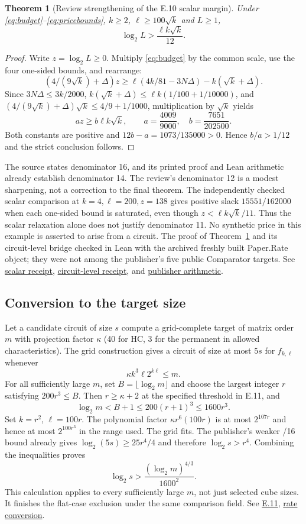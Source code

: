 \documentclass[11pt,letterpaper]{article}
\newtheorem{theorem}{Theorem}[section]
\theoremstyle{definition}\newtheorem{definition}[theorem]{Definition}\newtheorem{example}[theorem]{Example}
\theoremstyle{remark}\newtheorem{remark}[theorem]{Remark}
\newcommand{\pub}[3]{\href{https://github.com/anthropics/formal-math/blob/11b6c7e3c927df2658f513b6b68ea7f8929c62c5/vp-vnp/#1\#L#2}{#3}}
\newcommand{\aud}[2]{\href{https://github.com/nousentllc/VP-VNP-Review/blob/567303d0bcf4f9d54390437b137752446e58ccd6/#1}{#2}}
\begin{document}
\begin{theorem}[Review strengthening of the E.10 scalar margin]\label{thm:twelve}
Under \eqref{eq:budget}--\eqref{eq:pricebounds}, $k\ge2$, $\ell\ge100\sqrt k$ and $L\ge1$,
\[
 \log_2 L>\frac{\ell k\sqrt k}{12}.
\]
\end{theorem}
\begin{proof}
Write $z=\log_2 L\ge0$. Multiply \eqref{eq:budget} by the common scale, use the four one-sided bounds, and rearrange:
\[
 (4/(9\sqrt k)+\Delta)z
 \ge \ell(4k/81-3N\Delta)-k(\sqrt k+\Delta).
\]
Since $3N\Delta\le3k/2000$, $k(\sqrt k+\Delta)\le\ell k(1/100+1/10000)$, and $(4/(9\sqrt k)+\Delta)\sqrt k\le4/9+1/1000$, multiplication by $\sqrt k$ yields
\[
 az\ge b\ell k\sqrt k,\qquad
 a=\frac{4009}{9000},\quad b=\frac{7651}{202500}.
\]
Both constants are positive and $12b-a=1073/135000>0$. Hence $b/a>1/12$ and the strict conclusion follows.
\end{proof}
The source states denominator 16, and its printed proof and Lean arithmetic already establish denominator 14. The review's denominator 12 is a modest sharpening, not a correction to the final theorem. The independently checked scalar comparison at $k=4,\ell=200,z=138$ gives positive slack $15551/162000$ when each one-sided bound is saturated, even though $z<\ell k\sqrt k/11$. Thus the scalar relaxation alone does not justify denominator 11. No synthetic price in this example is asserted to arise from a circuit. The proof of Theorem~\ref{thm:twelve} and its circuit-level bridge checked in Lean with the archived freshly built Paper.Rate object; they were not among the publisher's five public Comparator targets. See \aud{checks/pass14a_margin_results.json}{scalar receipt}, \aud{checks/pass14a_circuit_results.json}{circuit-level receipt}, and \pub{Paper/Rate.lean}{123}{publisher arithmetic}.

\subsection{Conversion to the target size}\label{sec:flatconvert}
Let a candidate circuit of size $s$ compute a grid-complete target of matrix order $m$ with projection factor $\kappa$ (40 for HC, 3 for the permanent in allowed characteristics). The grid construction gives a circuit of size at most $5s$ for $f_{k,\ell}$ whenever
\[
 \kappa k^3\ell 2^{k\ell}\le m.
\]
For all sufficiently large $m$, set $B=\lfloor\log_2m\rfloor$ and choose the largest integer $r$ satisfying $200r^3\le B$. Then $r\ge\kappa+2$ at the specified threshold in E.11, and
\[
 \log_2m< B+1\le200(r+1)^3\le1600r^3.
\]
Set $k=r^2$, $\ell=100r$. The polynomial factor $\kappa r^6(100r)$ is at most $2^{107r}$ and hence at most $2^{100r^3}$ in the range used. The grid fits. The publisher's weaker /16 bound already gives $\log_2(5s)\ge25r^4/4$ and therefore $\log_2s>r^4$. Combining the inequalities proves
\[
 \log_2s>\frac{(\log_2m)^{4/3}}{1600^2}.
\]
This calculation applies to every sufficiently large $m$, not just selected cube sizes. It finishes the flat-case exclusion under the same comparison field. See \pub{Paper/Rate.lean}{337}{E.11}, \aud{passes/14a-flat.md}{rate conversion}.
\end{document}
